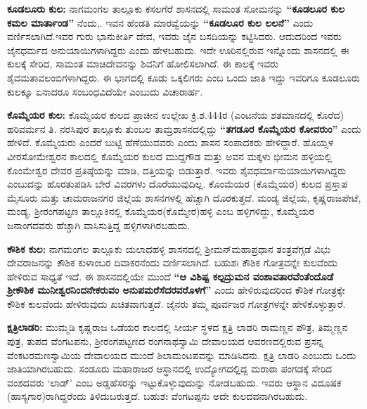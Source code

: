 \vskip 3pt

\textbf{ಕೂಡಲೂರು ಕುಲ:} ನಾಗಮಂಗಲ ತಾಲ್ಲೂಕು ಕಸಲಗೆರೆ ಶಾಸನದಲ್ಲಿ ಸಾಮಂತ ಸೋಮನನ್ನು \textbf{“ಕೂಡಲೂರ ಕುಲ ಕಮಲ ಮಾರ್ತಾಂಡ”} ನೆಂದು,. ಇವನ ಹೆಂಡತಿ ಮಾರವ್ವೆಯನ್ನು \textbf{“ಕೂಡಲೂರ ಕುಲ ಲಲನೆ”} ಎಂದು ವರ್ಣಿಸಲಾಗಿದೆ.\break ಇವರ ಗುರು ಭಾನುಕೀರ್ತಿ ದೇವ, ಇವರು ಜೈನ ಬಸದಿಯನ್ನು ಕಟ್ಟಿಸಿದರು. ಆದುದರಿಂದ ಇವರು ಜೈನಧರ್ಮದ ಅನುಯಾಯಿಗಳಾಗಿದ್ದರು ಎಂದು ಹೇಳಬಹುದು. ಇದೇ ಊರಿನಲ್ಲಿರುವ ಇನ್ನೊಂದು ಶಾಸನದಲ್ಲಿ ಈ ಕುಲಕ್ಕೆ ಸೇರಿದ, ಸಾಮಂತ ಮಾಚಿದೇವನನ್ನು ಶಿವನಿಗೆ ಹೋಲಿಸಲಾಗಿದೆ. ಈ ಕಾಲಕ್ಕೆ ಇವರು ಶೈವಮತಾವಲಂಬಿಗಳಾಗಿದ್ದರು. ಈ ಭಾಗದಲ್ಲಿ ಕೂಡು ಒಕ್ಕಲಿಗರು ಎಂಬ ಒಂದು ಜಾತಿ ಇದ್ದು ಇವರಿಗೂ ಕೂಡಲೂರು ಕುಲಕ್ಕೂ ಏನಾದರೂ ಸಂಬಂಧವಿದೆಯೇ ಎಂಬುದು ವಿಚಾರಾರ್ಹ.

\textbf{ಕೊಮ್ಮೆಯರ ಕುಲ:} ಕೊಮ್ಮೆಯರ ಕುಲದ ಪ್ರಾಚೀನ ಉಲ್ಲೇಖ ಕ್ರಿ.ಶ.444ರ (ಎಂಟನೆಯ ಶತಮಾನದಲ್ಲಿ ಕೊರೆದ) ಹರಿವರ್ಮನ ತಿ. ನರಸಿಪುರ ತಾಲ್ಲೂಕು ತುಂಬಲ ತಾಮ್ರಶಾಸನದಲ್ಲಿದ್ದು \textbf{“ತಗಡೂರ ಕೊಮ್ಮೆಯರ ಕೋವರುಂ”} ಎಂದು ಹೇಳಿದೆ. ಕೊಮ್ಮೆಯರು ಎಂದರೆ ಬುಟ್ಟಿ ಹೆಣೆಯುವವರು ಎಂದು ಶಾಸನ ಸಂಪಾದಕರು ಹೇಳಿದ್ದಾರೆ. ಹೊಯ್ಸಳ ವೀರಸೋಮೇಶ್ವರನ ಕಾಲದಲ್ಲಿ ಕೊಮ್ಮೆಯರ ಕುಲದ ಮುದ್ದಗೌಡ ಮತ್ತು ಅವನ ಮಕ್ಕಳು ಭೀಮನ ಹಳ್ಳಿಯಲ್ಲಿ ಕೊಂಮೇಶ್ವರ ದೇವರ ಪ್ರತಿಷ್ಠೆಯನ್ನು ಮಾಡಿ, ದತ್ತಿಯನ್ನು ಬಿಡುತ್ತಾರೆ. ಇವರು ಶೈವಧರ್ಮಾನುಯಾಯಿಗಳಾಗಿದ್ದರು ಎಂಬುದನ್ನು ಹೊರತುಪಡಿಸಿ ಬೇರೆ ವಿವರಗಳು ದೊರೆಯುವುದಿಲ್ಲ. ಕೊಂಮೆಯರ (ಕೊಮ್ಮೆಯರ) ಕುಲದ ಪ್ರಸ್ತಾಪ ಮೈಸೂರು ಮತ್ತು ಚಾಮರಾಜನಗರ ಜಿಲ್ಲೆಯ ಶಾಸನಗಳಲ್ಲಿ ಹೆಚ್ಚಾಗಿ ದೊರಕುತ್ತದೆ. ಮಂಡ್ಯ ಜಿಲ್ಲೆಯ, ಕೃಷ್ಣರಾಜಪೇಟೆ, ಮಂಡ್ಯ, ಶ‍್ರೀರಂಗಪಟ್ಟಣ ತಾಲ್ಲೂಕಿನಲ್ಲಿ ಕೊಮ್ಮೆಯರ(ಕೊಮ್ಮೇರ)ಹಳ್ಳಿ ಎಂಬ ಹಳ್ಳಿಗಳಿದ್ದು, ಕೊಮ್ಮೆಯರ ಜನಾಂಗದವರು ಹೆಚ್ಚಾಗಿ ವಾಸಿಸುತ್ತಿದ್ದ ಹಳ್ಳಿಗಳಾಗಿರಬಹುದು.

\textbf{ಕೌಶಿಕ ಕುಲ:} ನಾಗಮಂಗಲ ತಾಲ್ಲೂಕು ಯಲಾದಹಳ್ಳಿ ಶಾಸನದಲ್ಲಿ ಶ‍್ರೀಮನ್​ಮಹಾಪ್ರಧಾನ ತಂತ್ರವೆಗ್ಗಡೆ ವಿಭು ದೇವರಾಜನನ್ನು ಕೌಶಿಕ ಕುಳಾಂಬರ ದಿವಾಕರನೆಂದು ವರ್ಣಿಸಲಾಗಿದೆ. ಬಹುಶಃ ಕೌಶಿಕ ಗೋತ್ರವನ್ನೇ ಕುಲವೆಂದು ಹೇಳಿರುವ ಸಾಧ್ಯತೆ ಇದೆ. ಈ ಶಾಸನದಲ್ಲಿಯೇ ಮುಂದೆ \textbf{“ಆ ವಿಶಿಷ್ಟ ಕಲ್ಪದ್ರುಮನ ವಂಶಾವತಾರವೆಂತೆಂದೊಡೆ ಶ‍್ರೀಕೌಶಿಕ ಮುನೀಶ್ವರನಿಂದನೇಕರುವಂ ಅನುಪಮರೆಸೆದರವರೊಳಗೆ”} ಎಂದು ಹೇಳಿರುವುದರಿಂದ ಕೌಶಿಕ ಗೋತ್ರಕ್ಕೇ ಕೌಶಿಕ ಕುಲವೆಂದು ಹೇಳಿರುವುದು ಖಚಿತವಾಗುತ್ತದೆ. ಜೈನರು ತಮ್ಮ ಪೂರ್ವಜರ ಗೋತ್ರಗಳನ್ನೇ ಹೇಳಿಕೊಳ್ಳುತ್ತಾರೆ.

\textbf{ಕ್ಷತ್ರಿಲಾಡರಿ:} ಮುಮ್ಮಡಿ ಕೃಷ್ಣರಾಜ ಒಡೆಯರ ಕಾಲದಲ್ಲಿ ಸೀರ್ಯ ಸ್ಥಳದ ಕ್ಷತ್ರಿ ಲಾಡರಿ ರಾಮಣ್ಣನ ಪೌತ್ರ, ತಿಮ್ಮಣ್ಣನ ಪುತ್ರ, ತುಪದ ವೆಂಗಟಪನು, ಶ‍್ರೀರಂಗಪಟ್ಟಣದ ರಂಗನಾಥಸ್ವಾಮಿ ದೇವಾಲಯದ ಆವರಣದಲ್ಲಿರುವ ಪ್ರಸನ್ನ ವೆಂಕಟರಮಣಸ್ವಾಮಿಯ ದೇವಾಲಯದ ಮುಂದೆ ಶಿಲಾಮಂಟಪವನ್ನು ಮಾಡಿಸಿದನು. ಕ್ಷತ್ರಿ ಲಾಡರಿ ಎಂಬುದು ಒಂದು ಜಾತಿಯಾಗಿರಬಹುದು. ಸಂಡೂರು ಮಹಾರಾಜರ ಆಸ್ಥಾನದಲ್ಲಿ ಉದ್ಯೋಗದಲ್ಲಿದ್ದ ಮರಾಠಾ ಪಂಗಡಕ್ಕೆ ಸೇರಿದ ವಂಶದವರು ‘ಲಾಡ್​’ ಎಂಬ ಅಡ್ಡಹೆಸರನ್ನು ಇಟ್ಟುಕೊಳ್ಳುವುದುನ್ನು ನೋಡಬಹುದು. ಇವರು ಆಸ್ಥಾನ ವಿದೂಷಕ (ಹಾಸ್ಯಗಾರ)ರಾಗಿದ್ದರೆಂದು ತಿಳಿದುಬರುತ್ತದೆ. ಬಹುಶಃ ವೆಂಗಟಪ್ಪನು ಅದೇ ಕುಲದವನಾಗಿರಬಹುದು.

